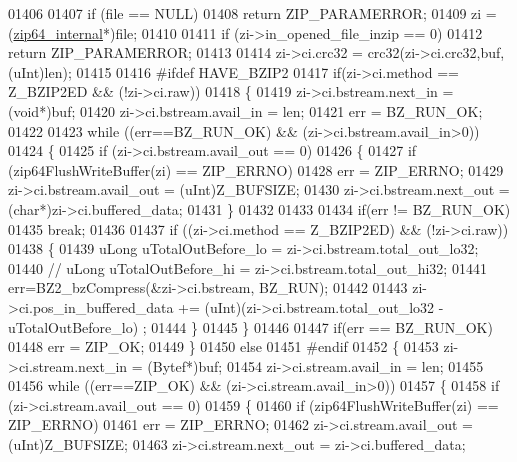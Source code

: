 \begin{DoxyCode}
01406 
01407     \textcolor{keywordflow}{if} (file == NULL)
01408         \textcolor{keywordflow}{return} ZIP\_PARAMERROR;
01409     zi = (\hyperlink{structzip64__internal}{zip64\_internal}*)file;
01410 
01411     \textcolor{keywordflow}{if} (zi->in\_opened\_file\_inzip == 0)
01412         \textcolor{keywordflow}{return} ZIP\_PARAMERROR;
01413 
01414     zi->ci.crc32 = crc32(zi->ci.crc32,buf,(uInt)len);
01415 
01416 \textcolor{preprocessor}{#ifdef HAVE\_BZIP2}
01417     \textcolor{keywordflow}{if}(zi->ci.method == Z\_BZIP2ED && (!zi->ci.raw))
01418     \{
01419       zi->ci.bstream.next\_in = (\textcolor{keywordtype}{void}*)buf;
01420       zi->ci.bstream.avail\_in = len;
01421       err = BZ\_RUN\_OK;
01422 
01423       \textcolor{keywordflow}{while} ((err==BZ\_RUN\_OK) && (zi->ci.bstream.avail\_in>0))
01424       \{
01425         \textcolor{keywordflow}{if} (zi->ci.bstream.avail\_out == 0)
01426         \{
01427           \textcolor{keywordflow}{if} (zip64FlushWriteBuffer(zi) == ZIP\_ERRNO)
01428             err = ZIP\_ERRNO;
01429           zi->ci.bstream.avail\_out = (uInt)Z\_BUFSIZE;
01430           zi->ci.bstream.next\_out = (\textcolor{keywordtype}{char}*)zi->ci.buffered\_data;
01431         \}
01432 
01433 
01434         \textcolor{keywordflow}{if}(err != BZ\_RUN\_OK)
01435           \textcolor{keywordflow}{break};
01436 
01437         \textcolor{keywordflow}{if} ((zi->ci.method == Z\_BZIP2ED) && (!zi->ci.raw))
01438         \{
01439           uLong uTotalOutBefore\_lo = zi->ci.bstream.total\_out\_lo32;
01440 \textcolor{comment}{//          uLong uTotalOutBefore\_hi = zi->ci.bstream.total\_out\_hi32;}
01441           err=BZ2\_bzCompress(&zi->ci.bstream,  BZ\_RUN);
01442 
01443           zi->ci.pos\_in\_buffered\_data += (uInt)(zi->ci.bstream.total\_out\_lo32 - uTotalOutBefore\_lo) ;
01444         \}
01445       \}
01446 
01447       \textcolor{keywordflow}{if}(err == BZ\_RUN\_OK)
01448         err = ZIP\_OK;
01449     \}
01450     \textcolor{keywordflow}{else}
01451 \textcolor{preprocessor}{#endif}
01452     \{
01453       zi->ci.stream.next\_in = (Bytef*)buf;
01454       zi->ci.stream.avail\_in = len;
01455 
01456       \textcolor{keywordflow}{while} ((err==ZIP\_OK) && (zi->ci.stream.avail\_in>0))
01457       \{
01458           \textcolor{keywordflow}{if} (zi->ci.stream.avail\_out == 0)
01459           \{
01460               \textcolor{keywordflow}{if} (zip64FlushWriteBuffer(zi) == ZIP\_ERRNO)
01461                   err = ZIP\_ERRNO;
01462               zi->ci.stream.avail\_out = (uInt)Z\_BUFSIZE;
01463               zi->ci.stream.next\_out = zi->ci.buffered\_data;

\end{DoxyCode}
